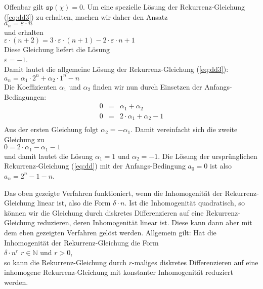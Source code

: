 \begin{enumerate}
      Offenbar gilt $\mathtt{sp}(\chi) = 0$.  Um eine spezielle L\"osung der
      Rekurrenz-Gleichung
      (\ref{eq:dd3}) zu erhalten, machen wir daher den Ansatz \\[0.1cm]
      \hspace*{1.3cm} $a_n = \varepsilon \cdot n$ \\[0.1cm]
      und erhalten \\[0.1cm]
      \hspace*{1.3cm} 
      $\varepsilon \cdot (n+2) = 3 \cdot \varepsilon \cdot (n+1) - 2 \cdot \varepsilon \cdot n + 1$ 
      \\[0.1cm]
      Diese Gleichung liefert die L\"osung \\[0.1cm]
      \hspace*{1.3cm} 
      $\varepsilon = -1$. \\[0.1cm]
      Damit lautet die allgemeine L\"osung der Rekurrenz-Gleichung (\ref{eq:dd3}): \\[0.1cm]
      \hspace*{1.3cm} $a_n = \alpha_1 \cdot 2^n + \alpha_2 \cdot 1^n - n$ \\[0.1cm]
      Die Koeffizienten $\alpha_1$ und $\alpha_2$ finden wir nun durch Einsetzen der
      Anfangs-Bedingungen:
      \[
      \begin{array}{lcl}
        0 & = & \alpha_1 + \alpha_2 \\
        0 & = & 2 \cdot \alpha_1 + \alpha_2 - 1 \\
      \end{array}
      \]
      Aus der ersten Gleichung folgt $\alpha_2 = - \alpha_1$.  Damit vereinfacht sich die
      zweite Gleichung zu \\[0.1cm]
      \hspace*{1.3cm} $0 = 2 \cdot \alpha_1 - \alpha_1 - 1$ \\[0.1cm]
      und damit lautet die L\"osung $\alpha_1 = 1$ und $\alpha_2 = -1$.  Die L\"osung der
      urspr\"unglichen Rekurrenz-Gleichung (\ref{eq:dd}) mit der Anfangs-Bedingung $a_0 = 0$ 
      ist also \\[0.1cm]
      \hspace*{1.3cm} $a_n = 2^n - 1 - n$.
\end{enumerate}
Das oben gezeigte Verfahren funktioniert, wenn die Inhomogenit\"at der Rekurrenz-Gleichung
linear ist, also die Form $\delta \cdot n$.  Ist die Inhomogenit\"at quadratisch, so k\"onnen wir
die Gleichung durch diskretes Differenzieren auf eine Rekurrenz-Gleichung reduzieren,
deren Inhomogenit\"at linear ist.  Diese kann dann aber mit dem eben gezeigten Verfahren
gel\"ost werden.  Allgemein gilt:  Hat die Inhomogenit\"at der Rekurrenz-Gleichung die Form \\[0.1cm]
\hspace*{1.3cm} $\delta \cdot n^r$ \quad $r \in \mathbb{N}$ und $r > 0$, \\[0.1cm]
so kann die Rekurrenz-Gleichung durch $r$-maliges diskretes Differenzieren auf eine
inhomogene Rekurrenz-Gleichung mit konstanter Inhomogenit\"at reduziert werden.
\vspace*{0.3cm}

